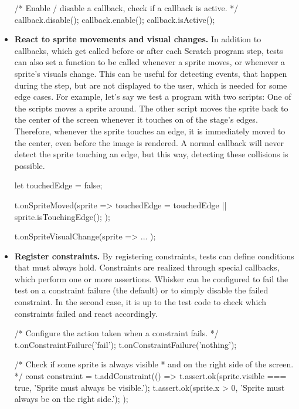 \begin{itemize}
\begin{javascriptcode}
            /* Enable / disable a callback, check if a callback is active. */
            callback.disable();
            callback.enable();
            callback.isActive();
        \end{javascriptcode}
    \item \textbf{React to sprite movements and visual changes.}
        In addition to callbacks, which get called before or after each Scratch program step,
        tests can also set a function to be called whenever a sprite moves, or whenever a sprite's visuals change.
        This can be useful for detecting events, that happen during the step, but are not displayed to the user,
        which is needed for some edge cases.
        For example, let's say we test a program with two scripts:
        One of the scripts moves a sprite around.
        The other script moves the sprite back to the center of the screen whenever it touches on of the stage's edges.
        Therefore, whenever the sprite touches an edge, it is immediately moved to the center,
        even before the image is rendered.
        A normal callback will never detect the sprite touching an edge,
        but this way, detecting these collisions is possible.
        \begin{javascriptcode}
            let touchedEdge = false;

            t.onSpriteMoved(sprite => {
                touchedEdge = touchedEdge || sprite.isTouchingEdge();
            });

            t.onSpriteVisualChange(sprite => { ... });
        \end{javascriptcode}
    \item \textbf{Register constraints.}
        By registering constraints, tests can define conditions that must always hold.
        Constraints are realized through special callbacks, which perform one or more assertions.
        Whisker can be configured to fail the test on a constraint failure (the default) or to simply disable the failed constraint.
        In the second case, it is up to the test code to check which constraints failed and react accordingly.
        \begin{javascriptcode}
            /* Configure the action taken when a constraint fails. */
            t.onConstraintFailure('fail');
            t.onConstraintFailure('nothing');

            /* Check if some sprite is always visible
             * and on the right side of the screen. */
            const constraint = t.addConstraint(() => {
                t.assert.ok(sprite.visible === true, 'Sprite must always be visible.');
                t.assert.ok(sprite.x > 0, 'Sprite must always be on the right side.');
            });


\end{javascriptcode}
\end{itemize}
